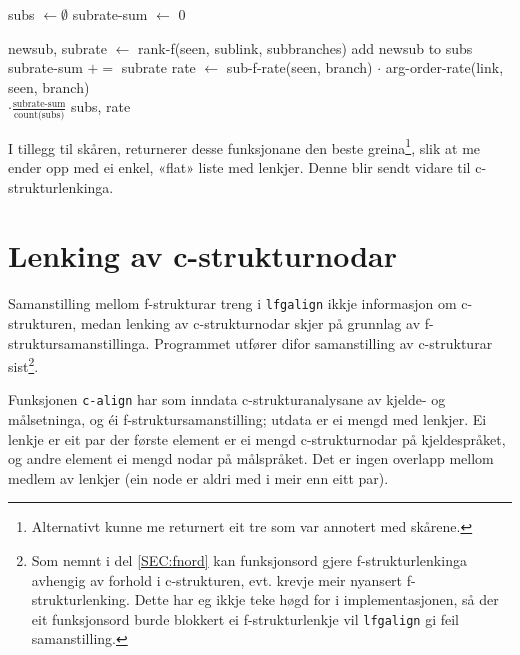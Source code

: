 \documentclass[12pt,a4paper,oneside,draft]{report}
\begin{document}
      \begin{algorithm}[htbp]
      subs $\gets \emptyset$ \;
      subrate-sum $\gets$ 0 \;
      \caption{rank-branch(seen, link, branch)}
      \label{algo:rank-branch}
         {
          newsub, subrate $\gets$ rank-f(seen, sublink, subbranches) \;
          add newsub to subs \;
          subrate-sum $+=$ subrate \;
        }
        rate $\gets$ sub-f-rate(seen, branch) $\cdot$ arg-order-rate(link, seen, branch) \\
        \hfill $\cdot \frac{\text{subrate-sum}}{\text{count(subs)}}$ \;
        \Return subs, rate \;
      \end{algorithm}

I tillegg til skåren, returnerer desse funksjonane den beste
greina\footnote{Alternativt kunne me returnert eit tre som var annotert med
        skårene. }, slik at me ender opp med ei enkel, «flat» liste med
lenkjer. Denne blir sendt vidare til c\hyp{}strukturlenkinga.


\section{Lenking av c\hyp{}strukturnodar}
\label{sec-4.3}

Samanstilling mellom f\hyp{}strukturar treng i \texttt{lfgalign} ikkje informasjon
om c\hyp{}strukturen, medan lenking av c\hyp{}strukturnodar skjer på grunnlag
av f\hyp{}struktursamanstillinga. Programmet utfører difor samanstilling av
c\hyp{}strukturar sist\footnote{Som nemnt i del \ref{SEC:fnord} kan funksjonsord gjere
       f\hyp{}strukturlenkinga avhengig av forhold i c\hyp{}strukturen,
       evt. krevje meir nyansert f\hyp{}strukturlenking. Dette har eg
       ikkje teke høgd for i implementasjonen, så der eit funksjonsord
       burde blokkert ei f\hyp{}strukturlenkje vil \texttt{lfgalign} gi feil
       samanstilling. }.

Funksjonen \texttt{c-align} har som inndata c\hyp{}strukturanalysane av kjelde- og
målsetninga, og éi f\hyp{}struktursamanstilling; utdata er ei mengd med
lenkjer. Ei lenkje er eit par der første element er ei mengd
c\hyp{}strukturnodar på kjeldespråket, og andre element ei mengd nodar på
målspråket. Det er ingen overlapp mellom medlem av lenkjer (ein node
er aldri med i meir enn eitt par).
\end{document}

